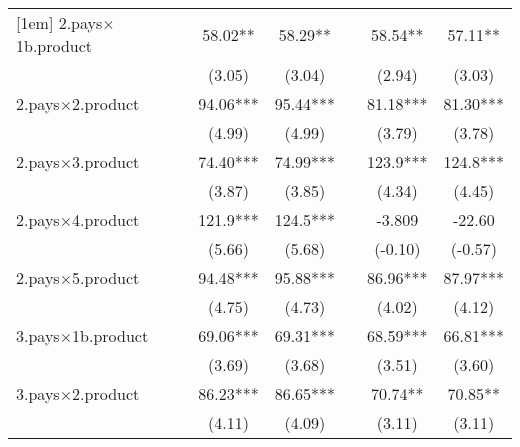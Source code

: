 {\begin{tabular}{l*{6}{c}}
[1em]
2.pays$\times$1b.product   &                     &       58.02** &       58.29** &                     &       58.54** &       57.11** \\
                    &                     &      (3.05)         &      (3.04)         &                     &      (2.94)         &      (3.03)         \\
[1em]
2.pays$\times$2.product    &                     &       94.06***&       95.44***&                     &       81.18***&       81.30***\\
                    &                     &      (4.99)         &      (4.99)         &                     &      (3.79)         &      (3.78)         \\
[1em]
2.pays$\times$3.product    &                     &       74.40***&       74.99***&                     &       123.9***&       124.8***\\
                    &                     &      (3.87)         &      (3.85)         &                     &      (4.34)         &      (4.45)         \\
[1em]
2.pays$\times$4.product    &                     &       121.9***&       124.5***&                     &      -3.809         &      -22.60         \\
                    &                     &      (5.66)         &      (5.68)         &                     &     (-0.10)         &     (-0.57)         \\
[1em]
2.pays$\times$5.product    &                     &       94.48***&       95.88***&                     &       86.96***&       87.97***\\
                    &                     &      (4.75)         &      (4.73)         &                     &      (4.02)         &      (4.12)         \\
[1em]
3.pays$\times$1b.product   &                     &       69.06***&       69.31***&                     &       68.59***&       66.81***\\
                    &                     &      (3.69)         &      (3.68)         &                     &      (3.51)         &      (3.60)         \\
[1em]
3.pays$\times$2.product    &                     &       86.23***&       86.65***&                     &       70.74** &       70.85** \\
                    &                     &      (4.11)         &      (4.09)         &                     &      (3.11)         &      (3.11)         \\

\end{tabular}}
